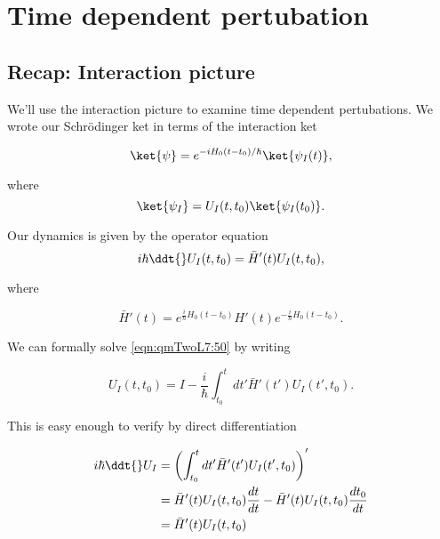 
%

\chapter{Time dependent pertubation}
\label{chap:qmTwoL7}
{}
\date{Sept 25, 2011}

\beginArtNoToc

\section{Recap: Interaction picture}

We'll use the interaction picture to examine time dependent pertubations.  We wrote our Schr\"{o}dinger ket in terms of the interaction ket

\begin{equation}\label{eqn:qmTwoL7:10}
\ket{\psi}
= e^{-i H_0 (t - t_0)/\hbar}
\ket{\psi_I(t)},
\end{equation}

where
\begin{equation}\label{eqn:qmTwoL7:30}
\ket{\psi_I}
= U_I(t, t_0) \ket{\psi_I(t_0)}.
\end{equation}

Our dynamics is given by the operator equation
\begin{equation}\label{eqn:qmTwoL7:50}
i \hbar \ddt{} U_I(t, t_0) = \bar{H}'(t) U_I(t, t_0),
\end{equation}

where

\begin{equation}\label{eqn:qmTwoL7:70}
\bar{H}'(t) =
e^{\frac{i}{\hbar} H_0(t - t_0)} H'(t) e^{-\frac{i}{\hbar} H_0(t - t_0)}.
\end{equation}

We can formally solve \ref{eqn:qmTwoL7:50} by writing

\begin{equation}\label{eqn:qmTwoL7:90}
U_I(t, t_0) = I - \frac{i}{\hbar} \int_{t_0}^t dt' \bar{H}'(t') U_I(t', t_0).
\end{equation}

This is easy enough to verify by direct differentiation

\begin{align*}
i \hbar \ddt{} U_I
&=
\left(\int_{t_0}^t dt' \bar{H}'(t') U_I(t', t_0) \right)' \\
&=
\bar{H}'(t) U_I(t, t_0) \frac{dt}{dt}
-
\bar{H}'(t) U_I(t, t_0) \frac{dt_0}{dt} \\
&=
\bar{H}'(t) U_I(t, t_0)
\end{align*}

